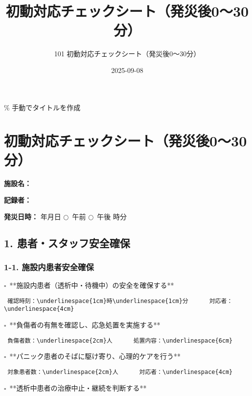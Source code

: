 \documentclass[
  japanese,
]{jarticle}
\title{初動対応チェックシート（発災後0～30分）}
\subtitle{101 初動対応チェックシート（発災後0～30分）}
\author{}
\date{2025-09-08}
\newcommand{\checkbox}{$\square$\ }
\newcommand{\underlinespace}[1]{\underline{\hspace{#1}}}
\newcommand{\circlecheck}{$\bigcirc$\ }
\begin{document}
\maketitle


\% 手動でタイトルを作成

\section{初動対応チェックシート（発災後0～30分）}\label{ux521dux52d5ux5bfeux5fdcux30c1ux30a7ux30c3ux30afux30b7ux30fcux30c8ux767aux707dux5f8c030ux5206}

\textbf{施設名：} \underlinespace{8cm}

\textbf{記録者：} \underlinespace{4cm}

\textbf{発災日時：}
\underlinespace{2cm}年\underlinespace{1cm}月\underlinespace{1cm}日
\circlecheck 午前 \circlecheck 午後
\underlinespace{1cm}時\underlinespace{1cm}分

\subsection{1.
患者・スタッフ安全確保}\label{ux60a3ux8005ux30b9ux30bfux30c3ux30d5ux5b89ux5168ux78baux4fdd}

\subsubsection{1-1.
施設内患者安全確保}\label{ux65bdux8a2dux5185ux60a3ux8005ux5b89ux5168ux78baux4fdd}

\checkbox **施設内患者（透析中・待機中）の安全を確保する**

\begin{verbatim}
 確認時刻：\underlinespace{1cm}時\underlinespace{1cm}分      対応者：\underlinespace{4cm}
\end{verbatim}

\checkbox **負傷者の有無を確認し、応急処置を実施する**

\begin{verbatim}
 負傷者数：\underlinespace{2cm}人      処置内容：\underlinespace{6cm}
\end{verbatim}

\checkbox **パニック患者のそばに駆け寄り、心理的ケアを行う**

\begin{verbatim}
 対象患者数：\underlinespace{2cm}人      対応者：\underlinespace{4cm}
\end{verbatim}

\checkbox **透析中患者の治療中止・継続を判断する**
\end{document}
